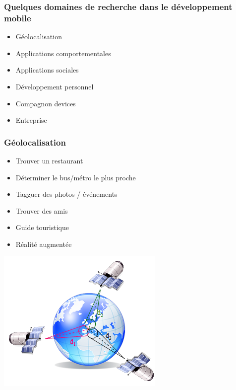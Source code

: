 \documentclass{beamer}
\begin{document}
\begin{frame}
\frametitle{Quelques domaines de recherche dans le développement mobile}

\begin{itemize}
	\item Géolocalisation
	\item Applications comportementales
	\item Applications sociales
	\item Développement personnel
	\item Compagnon devices
	\item Entreprise
\end{itemize}

\end{frame}

\begin{frame}
\frametitle{Géolocalisation}
\begin{itemize}
	\item Trouver un restaurant
	\item Déterminer le bus/métro le plus proche
	\item Tagguer des photos / événements
	\item Trouver des amis
	\item Guide touristique
	\item Réalité augmentée
\end{itemize}
\begin{center}
\includegraphics[scale=0.2]{geo.png}
\end{center}
\end{frame}
\end{document}
